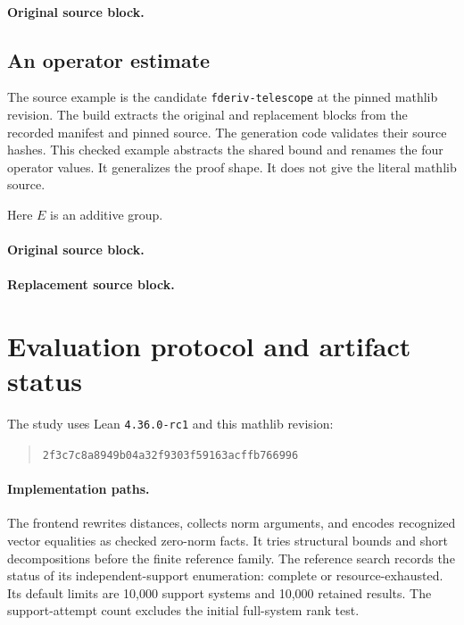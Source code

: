 \paragraph{Original source block.}

\subsection{An operator estimate}
The source example is the candidate \texttt{fderiv-telescope} at the pinned mathlib revision.
The build extracts the original and replacement blocks from the recorded manifest and pinned source.
The generation code validates their source hashes.
This checked example abstracts the shared bound and renames the four operator values.
It generalizes the proof shape.
It does not give the literal mathlib source.

Here $E$ is an additive group.

\paragraph{Original source block.}
\paragraph{Replacement source block.}

\section{Evaluation protocol and artifact status}\label{app:evaluation}
The study uses Lean \texttt{4.36.0-rc1} and this mathlib revision:
\begin{quote}\small\texttt{2f3c7c8a8949b04a32f9303f59163acffb766996}\end{quote}

\paragraph{Implementation paths.}
The frontend rewrites distances, collects norm arguments, and encodes recognized vector equalities as checked zero-norm facts.
It tries structural bounds and short decompositions before the finite reference family.
The reference search records the status of its independent-support enumeration: complete or resource-exhausted.
Its default limits are 10,000 support systems and 10,000 retained results.
The support-attempt count excludes the initial full-system rank test.

